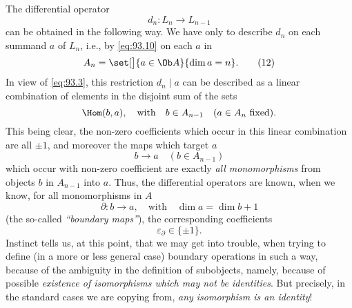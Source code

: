 \enspace
The differential operator
\begin{equation}
  \label{eq:93.11}
  d_n:L_n\to L_{n-1}\tag{11}
\end{equation}
can be obtained in the following way. We have only to describe $d_n$
on each summand $a$ of $L_n$, i.e., by \eqref{eq:93.10} on each $a$ in
\begin{equation}
  \label{eq:93.12}
  A_n=\set[\big]{a\in\Ob A}{\dim a=n}.\tag{12}
\end{equation}
In view of \eqref{eq:93.3}, this restriction $d_n\mid a$ can be
described as a linear combination of elements in the disjoint sum of
the sets
\[\Hom(b,a),\quad\text{with}\quad b\in A_{n-1}\quad (\text{$a\in A_n$
  fixed}).\]
This being clear, the non-zero coefficients which occur in
this linear combination are all $\pm1$, and moreover the maps which
target $a$
\[b\to a\quad(b\in A_{n-1})\]
which occur with non-zero coefficient are exactly \emph{all
  monomorphisms} from objects $b$ in $A_{n-1}$ into $a$. Thus, the
differential operators are known, when we know, for all monomorphisms
in $A$
\begin{equation}
  \label{eq:93.13}
  \partial:b\to a,\quad\text{with}\quad \dim a=\dim b+1\tag{13}
\end{equation}
(the so-called \emph{``boundary maps''}), the corresponding
coefficients
\begin{equation}
  \label{eq:93.14}
  \varepsilon_{\partial}\in\{\pm1\}.\tag{14}
\end{equation}
Instinct tells us, at this point, that we may get into trouble, when
trying to define (in a more or less general case) boundary operations
in such a way, because of the ambiguity in the definition of
subobjects, namely, because of possible \emph{existence of
  isomorphisms which may not be identities}. But precisely, in the
standard cases we are copying from, \emph{any isomorphism is an
  identity}!

